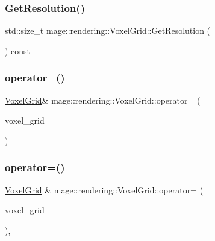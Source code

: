 \subsubsection{\texorpdfstring{Get\+Resolution()}{GetResolution()}}
{\footnotesize\ttfamily std\+::size\+\_\+t mage\+::rendering\+::\+Voxel\+Grid\+::\+Get\+Resolution (\begin{DoxyParamCaption}{ }\end{DoxyParamCaption}) const\hspace{0.3cm}{\ttfamily [noexcept]}}

\mbox{\label{classmage_1_1rendering_1_1_voxel_grid_a90b94d3a00e365e1a03d1077a5c79a11}} 
\subsubsection{\texorpdfstring{operator=()}{operator=()}\hspace{0.1cm}{\footnotesize\ttfamily [1/2]}}
{\footnotesize\ttfamily \mbox{\hyperlink{classmage_1_1rendering_1_1_voxel_grid}{Voxel\+Grid}}\& mage\+::rendering\+::\+Voxel\+Grid\+::operator= (\begin{DoxyParamCaption}\item[{const \mbox{\hyperlink{classmage_1_1rendering_1_1_voxel_grid}{Voxel\+Grid}} \&}]{voxel\+\_\+grid }\end{DoxyParamCaption})\hspace{0.3cm}{\ttfamily [delete]}}

\mbox{\label{classmage_1_1rendering_1_1_voxel_grid_a9e0ae3de8c583879a3db8b6d787138ac}} 
\subsubsection{\texorpdfstring{operator=()}{operator=()}\hspace{0.1cm}{\footnotesize\ttfamily [2/2]}}
{\footnotesize\ttfamily \mbox{\hyperlink{classmage_1_1rendering_1_1_voxel_grid}{Voxel\+Grid}} \& mage\+::rendering\+::\+Voxel\+Grid\+::operator= (\begin{DoxyParamCaption}\item[{\mbox{\hyperlink{classmage_1_1rendering_1_1_voxel_grid}{Voxel\+Grid}} \&\&}]{voxel\+\_\+grid }\end{DoxyParamCaption})\hspace{0.3cm}{\ttfamily [default]}, {\ttfamily [noexcept]}}

